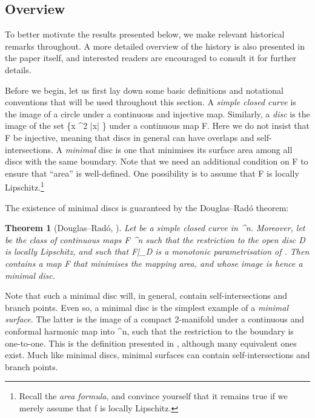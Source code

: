 \documentclass[a4paper, 11pt]{article}
\theoremstyle{plain}
\newtheorem{theorem}{Theorem}[section]
\theoremstyle{definition}
\theoremstyle{remark}
\numberwithin{equation}{subsection}
\def\({}
\def\){}
\begin{document}
\subsection{Overview}

To better motivate the results presented below, we make relevant historical remarks throughout. A more detailed overview of the history is also presented in the paper itself, and interested readers are encouraged to consult it for further details. 

Before we begin, let us first lay down some basic definitions and notational conventions that will be used throughout this section. A \emph{simple closed curve} is the image of a circle under a continuous and injective map. Similarly, a \emph{disc} is the image of the set \( \coloneq \{x \in {}^{2} \vcentcolon |x| \}\) under a continuous map \(F\). Here we do not insist that \(F\) be injective, meaning that discs in general can have overlaps and self-intersections. A \emph{minimal} disc is one that minimises its surface area among all discs with the same boundary. Note that we need an additional condition on \(F\) to ensure that ``area'' is well-defined. One possibility is to assume that \(F\) is locally Lipschitz.\footnote{Recall the \emph{area formula}, and convince yourself that it remains true if we merely assume that \(f\) is locally Lipschitz.}

The existence of minimal discs is guaranteed by the Douglas--Rad{\'o} theorem:

\begin{theorem}[{Douglas--Rad{\'o}, \cite[Theorem 35]{Whi16}}]
Let \(\Gamma\) be a simple closed curve in \(^{n}\). Moreover, let \(\) be the class of continuous maps \(F \vcentcolon {} \rightarrow {}^{n}\) such that the restriction to the open disc \(D\) is locally Lipschitz, and such that \(F\big|_{\partial D}\) is a monotonic parametrisation of \(\Gamma\). Then \(\) contains a map \(F\) that minimises the mapping area, and whose image is hence a minimal disc.
\end{theorem}

Note that such a minimal disc will, in general, contain self-intersections and branch points. Even so, a minimal disc is the simplest example of a \emph{minimal surface}. The latter is the image of a compact 2-manifold under a continuous and conformal harmonic map into \(^{n}\), such that the restriction to the boundary is one-to-one. This is the definition presented in \cite{EWW02}, although many equivalent ones exist. Much like minimal discs, minimal surfaces can contain self-intersections and branch points.
\end{document}
